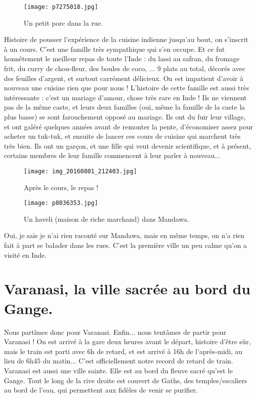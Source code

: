 \documentclass{book}
\begin{document}
\begin{figure}[h]
\centering
\texttt{[image: p7275018.jpg]}
\caption*{Un petit porc dans la rue.}
\end{figure}

Histoire de pousser l'expérience de la cuisine indienne jusqu'au bout, on s'inscrit à un cours. C'est une famille très sympathique qui s'en occupe. Et ce fut honnêtement le meilleur repas de toute l'Inde : du lassi au safran, du fromage frit, du curry de chou-fleur, des boules de coco, ... 9 plats au total, décorés avec des feuilles d'argent, et surtout carrément délicieux. On est impatient d'avoir à nouveau une cuisine rien que pour nous ! L'histoire de cette famille est aussi très intéressante : c'est un mariage d'amour, chose très rare en Inde ! Ils ne viennent pas de la même caste, et leurs deux familles (oui, même la famille de la caste la plus basse) se sont farouchement opposé au mariage. Ils ont du fuir leur village, et ont galéré quelques années avant de remonter la pente, d'économiser assez pour acheter un tuk-tuk, et ensuite de lancer ces cours de cuisine qui marchent très très bien. Ils ont un garçon, et une fille qui veut devenir scientifique, et à présent, certains membres de leur famille commencent à leur parler à nouveau...


\begin{figure}[h]
\centering
\texttt{[image: img\_20160801\_212403.jpg]}
\caption*{Après le cours, le repas !}
\end{figure}


\begin{figure}[h]
\centering
\texttt{[image: p8036353.jpg]}
\caption*{Un haveli (maison de riche marchand) dans Mandawa.}
\end{figure}







 Oui, je sais je n'ai rien raconté sur Mandawa, mais en même temps, on n'a rien fait à part se balader dans les rues. C'est la première ville un peu calme qu'on a visité en Inde.

\chapter{Varanasi, la ville sacrée au bord du Gange.}
Nous partîmes donc pour Varanasi. Enfin... nous tentâmes de partir pour Varanasi ! On est arrivé à la gare deux heures avant le départ, histoire d'être sûr, mais le train est parti avec 6h de retard, et est arrivé à 16h de l'après-midi, au lieu de 6h45 du matin... C'est officiellement notre record de retard de train. Varanasi est aussi une ville sainte. Elle est au bord du fleuve sacré qu'est le Gange. Tout le long de la rive droite est couvert de Gaths, des temples/escaliers au bord de l'eau, qui permettent aux fidèles de venir se purifier.
\end{document}

